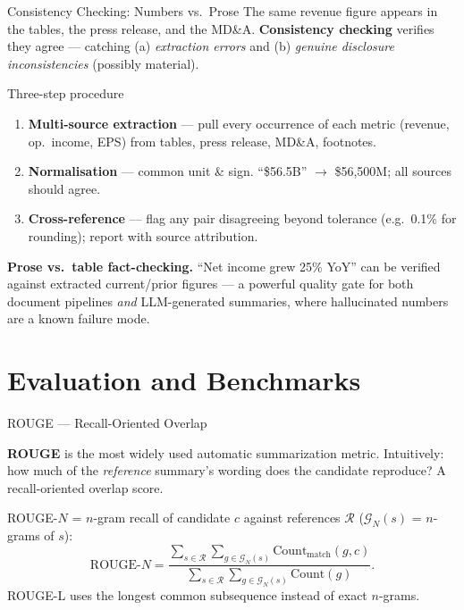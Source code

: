 \documentclass[9pt,t]{beamer}
\begin{document}
\begin{frame}{Consistency Checking: Numbers vs.\ Prose}
The same revenue figure appears in the tables, the press release, and the MD\&A.
\textbf{Consistency checking} verifies they agree --- catching (a) \emph{extraction
errors} and (b) \emph{genuine disclosure inconsistencies} (possibly material).

\medskip
\begin{block}{Three-step procedure}
\begin{enumerate}
  \item \textbf{Multi-source extraction} --- pull every occurrence of each metric
        (revenue, op.\ income, EPS) from tables, press release, MD\&A, footnotes.
  \item \textbf{Normalisation} --- common unit \& sign. ``\$56.5B'' $\to$
        \$56{,}500M; all sources should agree.
  \item \textbf{Cross-reference} --- flag any pair disagreeing beyond tolerance
        (e.g.\ 0.1\% for rounding); report with source attribution.
\end{enumerate}
\end{block}

\medskip
\textbf{Prose vs.\ table fact-checking.} ``Net income grew 25\% YoY'' can be
verified against extracted current/prior figures --- a powerful quality gate for
both document pipelines \emph{and} LLM-generated summaries, where hallucinated
numbers are a known failure mode.
\end{frame}

\section{Evaluation and Benchmarks}

\begin{frame}{ROUGE --- Recall-Oriented Overlap}
\begin{bigpicture}
\textbf{ROUGE} is the most widely used automatic summarization metric. Intuitively:
how much of the \emph{reference} summary's wording does the candidate reproduce?
A recall-oriented overlap score.
\end{bigpicture}

\begin{underhood}
ROUGE-$N$ = $n$-gram recall of candidate $c$ against references $\mathcal{R}$
($\mathcal{G}_N(s)$ = $n$-grams of $s$):
\[
\text{ROUGE-}N=\frac{\sum_{s\in\mathcal{R}}\sum_{g\in\mathcal{G}_N(s)}
\mathrm{Count}_{\text{match}}(g,c)}
{\sum_{s\in\mathcal{R}}\sum_{g\in\mathcal{G}_N(s)}\mathrm{Count}(g)}.
\]
ROUGE-L uses the longest common subsequence instead of exact $n$-grams.
\end{underhood}
\end{frame}
\end{document}
